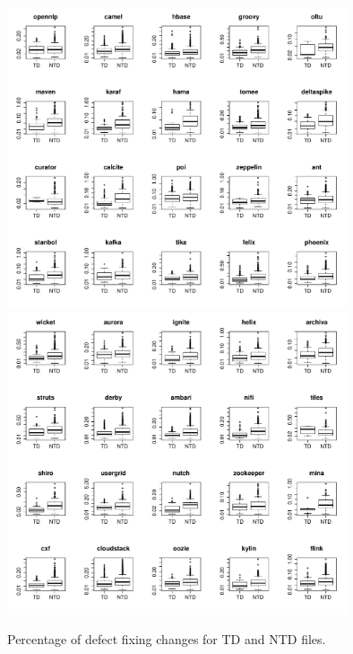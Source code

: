 \begin{figure}[tb]
	\centering
	\includegraphics[width=100mm]{figures/chapter4/RQ1_boxplots_td_1}
	\includegraphics[width=100mm]{figures/chapter4/RQ1_boxplots_td_2}
	\caption{Percentage of defect fixing changes for TD and NTD files.}
	\label{figure:percentage_of_defects_td_vs_ntd}
\end{figure}




